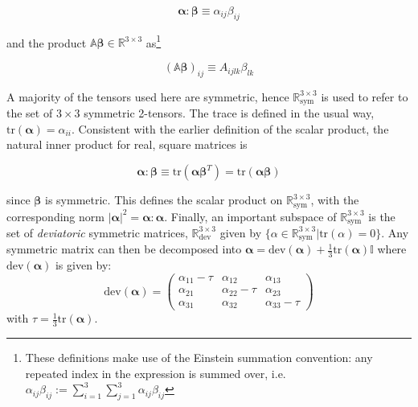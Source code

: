 \begin{multicols}{2}
$$\bm{\alpha} : \bm{\beta} \equiv \alpha_{ij}\beta_{ij}$$

and the product $\mathbb{A}\bm{\beta} \in \mathbb{R}^{3\times3}$ as\footnote{These definitions make use of the Einstein summation convention: any repeated index in the expression is summed over, i.e. $\alpha_{ij}\beta_{ij} := \sum_{i=1}^{3}\sum_{j=1}^{3} \alpha_{ij}\beta_{ij}$}

$$(\mathbb{A}\bm{\beta})_{ij} \equiv A_{ijlk}\beta_{lk}$$

A majority of the tensors used here are symmetric, hence $\mathbb{R}^{3\times3}_{\mathrm{sym}}$ is used to refer to the set of $3\times3$ symmetric 2-tensors. The trace is defined in the usual way, $\mathrm{tr}(\bm{\alpha}) = \alpha_{ii}$. Consistent with the earlier definition of the scalar product, the natural inner product for real, square matrices is

$$\bm{\alpha}:\bm{\beta} \equiv \mathrm{tr}(\bm{\alpha}\bm{\beta}^T) = \mathrm{tr}(\bm{\alpha}\bm{\beta})$$

since $\bm{\beta}$ is symmetric. This defines the scalar product on $\mathbb{R}^{3\times3}_{\mathrm{sym}}$, with the corresponding norm $|\bm{\alpha}|^2 = \bm{\alpha}:\bm{\alpha}$. Finally, an important subspace of $\mathbb{R}^{3\times3}_{\mathrm{sym}}$ is the set of \textit{deviatoric} symmetric matrices, $\mathbb{R}^{3\times3}_{\mathrm{dev}}$ given by $\{\alpha \in \mathbb{R}^{3\times3}_{\mathrm{sym}}|\mathrm{tr}(\alpha) = 0\}$. Any symmetric matrix can then be decomposed into $\bm{\alpha} = \mathrm{dev}(\bm{\alpha}) + \frac{1}{3}\mathrm{tr}(\bm{\alpha})\mathbb{I}$ where $\mathrm{dev}(\bm{\alpha})$ is given by:
$$\mathrm{dev}(\bm{\alpha})=\begin{pmatrix}
\alpha_{11} - \tau & \alpha_{12} & \alpha_{13}\\
\alpha_{21} & \alpha_{22} - \tau & \alpha_{23}\\
\alpha_{31} & \alpha_{32} & \alpha_{33} - \tau
\end{pmatrix}$$
with $\tau = \frac{1}{3}\mathrm{tr}(\bm{\alpha})$.


\end{multicols}
